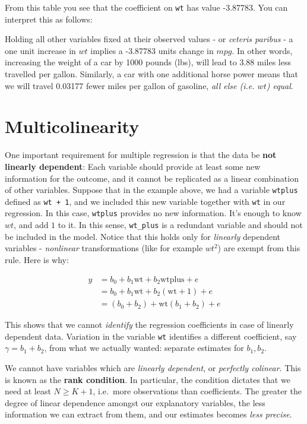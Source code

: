\documentclass[]{book}
\newenvironment{note}{\begin{tcolorbox}[colback=blue!5!white,colframe=blue!75!black]}{\end{tcolorbox}}
\newenvironment{warning}{\begin{tcolorbox}[colback=orange!5!white,colframe=orange]}{\end{tcolorbox}}
\begin{document}
From this table you see that the coefficient on \texttt{wt} has value -3.87783. You can interpret this as follows:

\begin{warning}
Holding all other variables fixed at their observed values - or
\emph{ceteris paribus} - a one unit increase in \(wt\) implies a
-3.87783 units change in \(mpg\). In other words, increasing the weight
of a car by 1000 pounds (lbs), will lead to 3.88 miles less travelled
per gallon. Similarly, a car with one additional horse power means that
we will travel 0.03177 fewer miles per gallon of gasoline, \emph{all
else (i.e. \(wt\)) equal}.
\end{warning}

\hypertarget{multicol}{%
\section{Multicolinearity}\label{multicol}}

One important requirement for multiple regression is that the data be \textbf{not linearly dependent}: Each variable should provide at least some new information for the outcome, and it cannot be replicated as a linear combination of other variables. Suppose that in the example above, we had a variable \texttt{wtplus} defined as \texttt{wt\ +\ 1}, and we included this new variable together with \texttt{wt} in our regression. In this case, \texttt{wtplus} provides no new information. It's enough to know \(wt\), and add \(1\) to it. In this sense, \texttt{wt\_plus} is a redundant variable and should not be included in the model. Notice that this holds only for \emph{linearly} dependent variables - \emph{nonlinear} transformations (like for example \(wt^2\)) are exempt from this rule. Here is why:

\begin{align}
y &= b_0 + b_1 \text{wt} + b_2 \text{wtplus} + e \\
  &= b_0 + b_1 \text{wt} + b_2 (\text{wt} + 1) + e \\
  &= (b_0 + b_2) + \text{wt} (b_1 + b_2) + e
\end{align}

This shows that we cannot \emph{identify} the regression coefficients in case of linearly dependent data. Variation in the variable \texttt{wt} identifies a different coefficient, say \(\gamma = b_1 + b_2\), from what we actually wanted: separate estimates for \(b_1,b_2\).

\begin{note}
We cannot have variables which are \emph{linearly dependent}, or
\emph{perfectly colinear}. This is known as the \textbf{rank condition}.
In particular, the condition dictates that we need at least
\(N \geq K+1\), i.e.~more observations than coefficients. The greater
the degree of linear dependence amongst our explanatory variables, the
less information we can extract from them, and our estimates becomes
\emph{less precise}.
\end{note}
\end{document}
